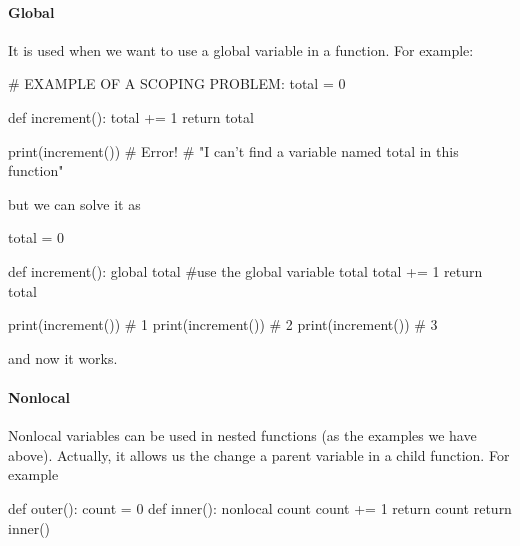 \paragraph{\bf Global} It is used when we want to use a global variable in a function. For example: 
\begin{listing}{1}
# EXAMPLE OF A SCOPING PROBLEM:
total = 0

def increment():
    total += 1
    return total

print(increment()) # Error! 
# "I can't find a variable named total in this function"
\end{listing}    
but we can solve it as 
\begin{listing}{1}
total = 0

def increment():
    global total #use the global variable total
    total += 1
    return total

print(increment()) # 1
print(increment()) # 2
print(increment()) # 3    
\end{listing}
and now it works. 

\paragraph{\bf Nonlocal} Nonlocal variables can be used in nested functions (as the examples we have above). Actually, it allows us the change a parent variable in a child function. For example 
\begin{listing}{1}
def outer():
    count = 0 
    def inner():
        nonlocal count
        count += 1
        return count 
    return inner()
\end{listing}